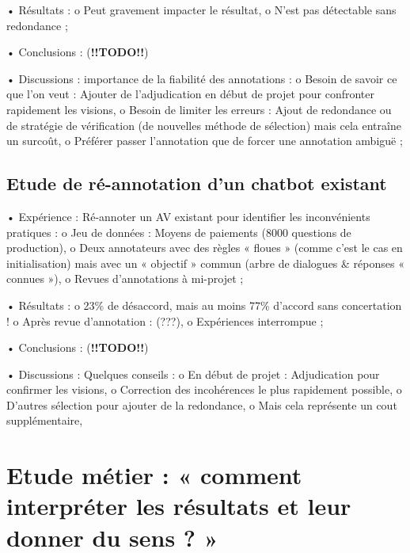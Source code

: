         •	Résultats : 
            o	Peut gravement impacter le résultat,
            o	N’est pas détectable sans redondance ;

        •	Conclusions :  (\textbf{!!TODO!!})

        •	Discussions : importance de la fiabilité des annotations :
            o	Besoin de savoir ce que l’on veut : Ajouter de l’adjudication en début de projet pour confronter rapidement les visions,
            o	Besoin de limiter les erreurs : Ajout de redondance ou de stratégie de vérification (de nouvelles méthode de sélection) mais cela entraîne un surcoût,
            o	Préférer passer l’annotation que de forcer une annotation ambiguë ;


        \subsection{Etude de ré-annotation d’un chatbot existant}

        •	Expérience : Ré-annoter un AV existant pour identifier les inconvénients pratiques :
            o	Jeu de données : Moyens de paiements (8000 questions de production),
            o	Deux annotateurs avec des règles « floues » (comme c’est le cas en initialisation) mais avec un « objectif » commun (arbre de dialogues \& réponses « connues »),
            o	Revues d’annotations à mi-projet ;

        •	Résultats :
            o	23\% de désaccord, mais au moins 77\% d’accord sans concertation !
            o	Après revue d’annotation : (???),
            o	Expériences interrompue ;

        •	Conclusions :  (\textbf{!!TODO!!})

        •	Discussions : Quelques conseils :
            o	En début de projet : Adjudication pour confirmer les visions,
            o	Correction des incohérences le plus rapidement possible,
            o	D’autres sélection pour ajouter de la redondance,
            o	Mais cela représente un cout supplémentaire,


    \section{Etude métier : « comment interpréter les résultats et leur donner du sens ? »}


